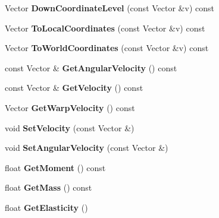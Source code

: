 \begin{DoxyCompactItemize}
\item 
Vector {\bfseries Down\+Coordinate\+Level} (const Vector \&v) const \hypertarget{classUnit_aa436e33644e7b0ec8f546eefd56f1c01}{}\label{classUnit_aa436e33644e7b0ec8f546eefd56f1c01}

\item 
Vector {\bfseries To\+Local\+Coordinates} (const Vector \&v) const \hypertarget{classUnit_adeabdf7e1e04ea339ec39e4e2ca69090}{}\label{classUnit_adeabdf7e1e04ea339ec39e4e2ca69090}

\item 
Vector {\bfseries To\+World\+Coordinates} (const Vector \&v) const \hypertarget{classUnit_ae1b5895ffed4a7e8c5560bfe6ad1c77d}{}\label{classUnit_ae1b5895ffed4a7e8c5560bfe6ad1c77d}

\item 
const Vector \& {\bfseries Get\+Angular\+Velocity} () const \hypertarget{classUnit_aa6b2daec6cfe6638fa59daeeabe4ffbb}{}\label{classUnit_aa6b2daec6cfe6638fa59daeeabe4ffbb}

\item 
const Vector \& {\bfseries Get\+Velocity} () const \hypertarget{classUnit_ac7c101afab53be3fe4e944e2a265f1c4}{}\label{classUnit_ac7c101afab53be3fe4e944e2a265f1c4}

\item 
Vector {\bfseries Get\+Warp\+Velocity} () const \hypertarget{classUnit_adcd7831c02f887a898513b675c84c573}{}\label{classUnit_adcd7831c02f887a898513b675c84c573}

\item 
void {\bfseries Set\+Velocity} (const Vector \&)\hypertarget{classUnit_af9bf791af157f131b9861c106eb75434}{}\label{classUnit_af9bf791af157f131b9861c106eb75434}

\item 
void {\bfseries Set\+Angular\+Velocity} (const Vector \&)\hypertarget{classUnit_aebe09575113121347ba77dc6c8f1b323}{}\label{classUnit_aebe09575113121347ba77dc6c8f1b323}

\item 
float {\bfseries Get\+Moment} () const \hypertarget{classUnit_a82086ff6136a6d8b10cc9ac4b8b9fdf0}{}\label{classUnit_a82086ff6136a6d8b10cc9ac4b8b9fdf0}

\item 
float {\bfseries Get\+Mass} () const \hypertarget{classUnit_a9c875cadc8fdea33b895a94fb61b81c5}{}\label{classUnit_a9c875cadc8fdea33b895a94fb61b81c5}

\item 
float {\bfseries Get\+Elasticity} ()\hypertarget{classUnit_aa29367541d8800a845ce91f5edca89ff}{}\label{classUnit_aa29367541d8800a845ce91f5edca89ff}


\end{DoxyCompactItemize}
